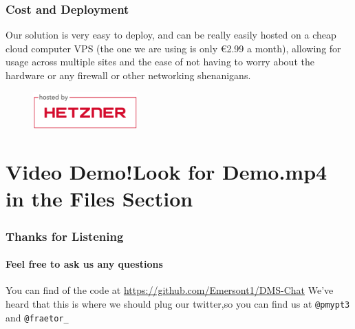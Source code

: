 \documentclass[aspectratio=169]{beamer}
\begin{document}
\begin{frame}{}
    \frametitle{Cost and Deployment}
    Our solution is very easy to deploy, and can be really easily hosted on a cheap cloud computer VPS (the one we are using is only €2.99 a month), allowing for usage across multiple sites and the  ease of not having to worry about the hardware or any firewall or other networking shenanigans.
    \begin{figure}
        \centering
        \includegraphics[width=4cm]{hosted-by-hetzner-201.png}
        \label{fig:hetzner_logo}
    \end{figure}
\end{frame}

\section{Video Demo!\newline \newline Look for Demo.mp4 in the Files Section}

\begin{frame}{}
    \frametitle{Thanks for Listening}
    \framesubtitle{Feel free to ask us any questions}
    You can find of the code at \url{https://github.com/Emersont1/DMS-Chat} \newline \newline
    We've heard that this is where we should plug our twitter,\newline so you can find us at \texttt{@pmypt3} and \texttt{@fraetor\_}
\end{frame}
\end{document}
